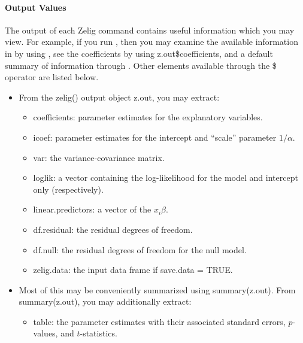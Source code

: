 \documentclass[letterpaper,10pt,english]{sphinxmanual}
\begin{document}
\paragraph{Output Values}
\label{zelig-weibull:output-values}
The output of each Zelig command contains useful information which you
may view. For example, if you run
, then you may examine
the available information in  by using , see
the coefficients by using z.out\$coefficients, and a default summary of
information through . Other elements available through
the \$ operator are listed below.
\begin{itemize}
\item {} 
From the zelig() output object z.out, you may extract:
\begin{itemize}
\item {} 
coefficients: parameter estimates for the explanatory variables.

\item {} 
icoef: parameter estimates for the intercept and “scale” parameter
\(1 / \alpha\).

\item {} 
var: the variance-covariance matrix.

\item {} 
loglik: a vector containing the log-likelihood for the model and
intercept only (respectively).

\item {} 
linear.predictors: a vector of the \(x_{i}\beta\).

\item {} 
df.residual: the residual degrees of freedom.

\item {} 
df.null: the residual degrees of freedom for the null model.

\item {} 
zelig.data: the input data frame if save.data = TRUE.

\end{itemize}

\item {} 
Most of this may be conveniently summarized using summary(z.out).
From summary(z.out), you may additionally extract:
\begin{itemize}
\item {} 
table: the parameter estimates with their associated standard
errors, \(p\)-values, and \(t\)-statistics.


\end{itemize}
\end{itemize}
\end{document}

